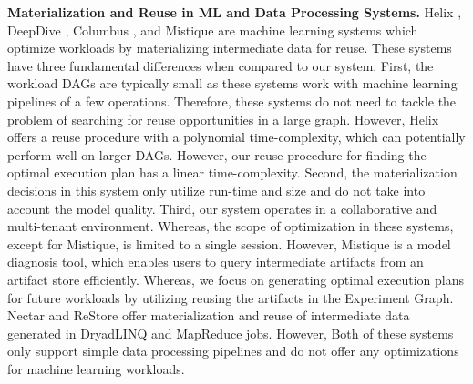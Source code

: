 \textbf{Materialization and Reuse in ML and Data Processing Systems.}
Helix \cite{xin2018h, xin2018helix}, DeepDive \cite{zhang2015deepdive}, Columbus \cite{zhang2016materialization}, and Mistique \cite{vartak2018mistique} are machine learning systems which optimize workloads by materializing intermediate data for reuse.
These systems have three fundamental differences when compared to our system.
First, the workload DAGs are typically small as these systems work with machine learning pipelines of a few operations.
Therefore, these systems do not need to tackle the problem of searching for reuse opportunities in a large graph.
However, Helix offers a reuse procedure with a polynomial time-complexity, which can potentially perform well on larger DAGs.
However, our reuse procedure for finding the optimal execution plan has a linear time-complexity.
Second, the materialization decisions in this system only utilize run-time and size and do not take into account the model quality.
Third, our system operates in a collaborative and multi-tenant environment.
Whereas, the scope of optimization in these systems, except for Mistique, is limited to a single session.
However, Mistique is a model diagnosis tool, which enables users to query intermediate artifacts from an artifact store efficiently.
Whereas, we focus on generating optimal execution plans for future workloads by utilizing reusing the artifacts in the Experiment Graph.
Nectar \cite{gunda2010nectar} and ReStore \cite{elghandour2012restore} offer materialization and reuse of intermediate data generated in DryadLINQ \cite{fetterly2009dryadlinq} and MapReduce jobs.
However, Both of these systems only support simple data processing pipelines and do not offer any optimizations for machine learning workloads.
